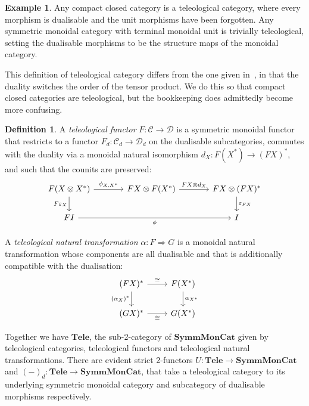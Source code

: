 \documentclass[11pt,letterpaper]{article}
\theoremstyle{plain}
\theoremstyle{definition}
\newtheorem{definition}[theorem]{Definition}
\newtheorem{example}[theorem]{Example}
\newcommand{\C}{\mathscr{C}}
\newcommand{\D}{\mathscr{D}}
\newcommand{\SymmMonCat}{\mathbf{SymmMonCat}}
\newcommand{\Tele}{\mathbf{Tele}}
\newcommand{\todo}[1]{\textcolor{red}{\small #1}}
\begin{document}
\begin{example}
  Any compact closed category is a teleological category, where every morphism is dualisable and the unit morphisms have been forgotten. Any symmetric monoidal category with terminal monoidal unit is trivially teleological, setting the dualisable morphisms to be the structure maps of the monoidal category.
\end{example}

This definition of teleological category differs from the one given in~\cite{CoherenceForLenses}, in that the duality switches the order of the tensor product. We do this so that compact closed categories are teleological, but the bookkeeping does admittedly become more confusing.



\begin{definition}
  A \emph{teleological functor} $F : \C \to \D$ is a symmetric monoidal functor that restricts to a functor $F_d : \C_d \to \D_d$ on the dualisable subcategories, commutes with the duality via a monoidal natural isomorphism $d_X : F(X^*) \to (FX)^*$, and such that the counits are preserved:
  \[
   \begin{tikzcd}[column sep = large]
    F(X \otimes X^*) \ar[r, "\phi_{X, X^*}"]  \ar[d, "F\varepsilon_X", swap] & FX \otimes F(X^*) \ar[r, "FX \otimes d_X"] & FX \otimes (FX)^* \ar[d, "\varepsilon_{FX}"] \\
    FI \ar[rr, "\phi", swap] & & I
  \end{tikzcd}
  \]
  
  A \emph{teleological natural transformation} $\alpha : F \Rightarrow G$ is a monoidal natural transformation whose components are all dualisable and that is additionally compatible with the dualisation:
  \[
  \begin{tikzcd}
    (FX)^* \ar[r, "\cong"]  \ar[d, "(\alpha_X)^*", swap] & F(X^*) \ar[d, "\alpha_{X^*}"] \\
    (GX)^* \ar[r, "\cong", swap] & G(X^*)
  \end{tikzcd}
  \]
\end{definition}

Together we have $\Tele$, the sub-2-category of $\SymmMonCat$ given by teleological categories, teleological functors and teleological natural transformations. There are evident strict 2-functors $U : \Tele \to \SymmMonCat$ and ${(-)}_d : \Tele \to \SymmMonCat$, that take a teleological category to its underlying symmetric monoidal category and subcategory of dualisable morphisms respectively.
\end{document}
